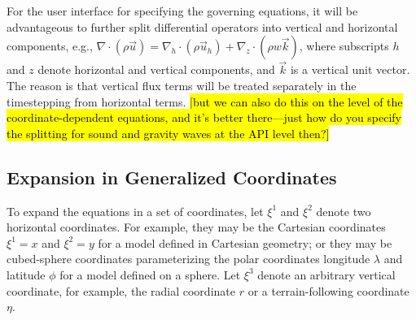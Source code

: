 \documentclass{report}
\begin{document}
For the user interface for specifying the governing equations, it will be advantageous to further split differential operators into vertical and horizontal components, e.g., $\nabla \cdot (\rho \vec{u}) = \nabla_h \cdot (\rho \vec{u}_h) + \nabla_z \cdot (\rho w \vec{k})$, where subscripts $h$ and $z$ denote horizontal and vertical components, and $\vec{k}$ is a vertical unit vector. The reason is that vertical flux terms will be treated separately in the timestepping from horizontal terms. \hl{[but we can also do this on the level of the coordinate-dependent equations, and it's better there---just how do you specify the splitting for sound and gravity waves at the API level then?]}

\subsection{Expansion in Generalized Coordinates}

To expand the equations in a set of coordinates, let $\xi^1$ and $\xi^2$ denote two horizontal coordinates. For example, they may be the Cartesian coordinates $\xi^1 = x$ and $\xi^2 =y$ for a model defined in Cartesian geometry; or they may be cubed-sphere coordinates parameterizing the polar coordinates longitude $\lambda$ and latitude $\phi$ for a model defined on a sphere. Let $\xi^3$ denote an arbitrary vertical coordinate, for example, the radial coordinate $r$ or a terrain-following coordinate $\eta$. 
\end{document}
